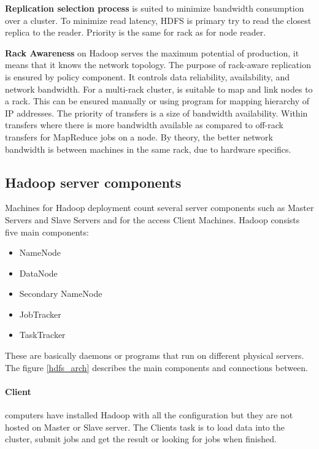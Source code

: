 \documentclass[a4paper,12pt,oneside]{report}
\begin{document}
\textbf{Replication selection process} is suited to minimize bandwidth consumption over a cluster. 
To minimize read latency, HDFS is primary try to read the closest replica to the reader. Priority is the 
same for rack as for node reader. \cite{hadoop_hdfs_web}

\textbf{Rack Awareness} on Hadoop serves the maximum potential of production, 
it means that it knows the network topology. The purpose of rack-aware replication is ensured by policy 
component. It controls data reliability, availability, and network bandwidth. For a multi-rack cluster, is suitable to map and link
nodes to a rack\cite{hadoop_rack_web}. This can be ensured manually or using program for mapping hierarchy of IP 
addresses. The priority of transfers is a size of bandwidth availability. Within transfers 
where there is more bandwidth available as compared to off-rack transfers for MapReduce jobs on a node. 
By theory, the better network bandwidth is between machines in the same rack, due to hardware specifics.

		\subsection{Hadoop server components}
Machines for Hadoop deployment count several server components such as Master Servers and Slave Servers and for the access Client Machines.  Hadoop consists five main components: 
\begin{itemize}[noitemsep]
\item NameNode
\item DataNode
\item Secondary NameNode
\item JobTracker
\item TaskTracker
\end{itemize}
These are basically daemons or programs that run on different physical servers.
The figure \ref{hdfs_arch} describes the main components and connections between.

\paragraph{Client}
computers have installed Hadoop with  all the configuration but they are not hosted on Master or Slave 
server. The Clients task is to  load data into the cluster, submit jobs and get the result or looking for jobs when finished.
		
\end{document}
